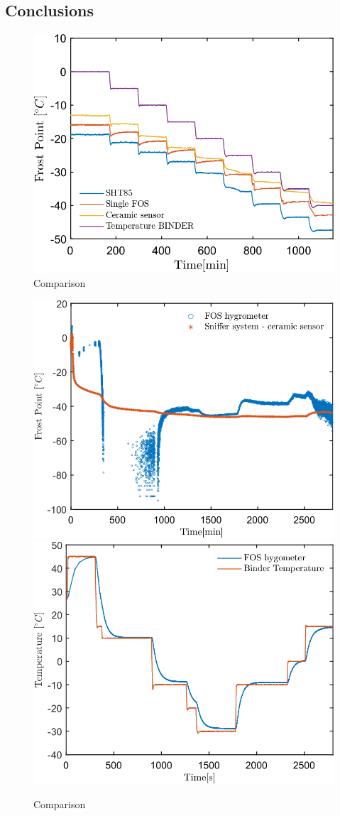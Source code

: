 \subsection{Conclusions}


\begin{figure}[!h]
\centering
\includegraphics[width=0.6\columnwidth]{Chapter5/images/DPCPercent.png}
\caption{Comparison}
\label{fig_comparison}
\end{figure}

\begin{figure}[!h]
\centering
\includegraphics[width=0.6\columnwidth]{Chapter5/images/FOS_performance.png}
\includegraphics[width=0.6\columnwidth]{Chapter5/images/FOS_performance_T.png}
\caption{Comparison}
\label{fig_comparison1}
\end{figure}